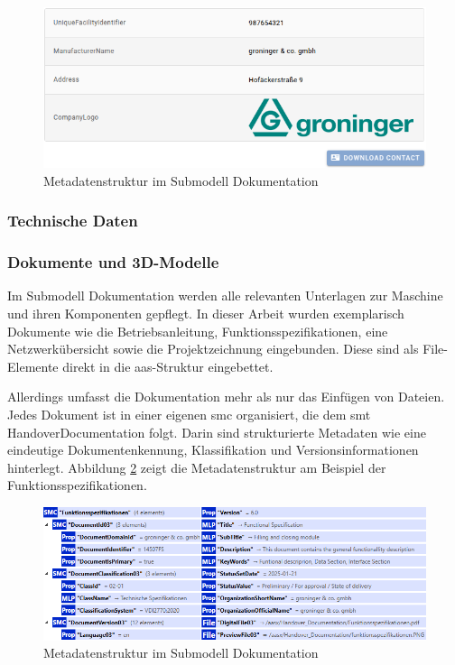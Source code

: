 \begin{figure}[htbp]
    \centering
        \includegraphics[width=1\textwidth]{Bilder/Ergebnisse/StatischeDaten/Typenschildisualisierung.png}
    \caption{Metadatenstruktur im Submodell Dokumentation}
    \label{fig:Doku}
\end{figure}

\subsubsection*{Technische Daten}
\vspace{-0.5em}


\subsubsection*{Dokumente und 3D-Modelle}
\vspace{-0.5em}
Im Submodell Dokumentation werden alle relevanten Unterlagen zur Maschine und ihren Komponenten gepflegt.
In dieser Arbeit wurden exemplarisch Dokumente wie die Betriebsanleitung, Funktionsspezifikationen, eine Netzwerkübersicht sowie die Projektzeichnung eingebunden.
Diese sind als File-Elemente direkt in die \acs{aas}-Struktur eingebettet.

Allerdings umfasst die Dokumentation mehr als nur das Einfügen von Dateien.
Jedes Dokument ist in einer eigenen \acs{smc} organisiert, die dem \acs{smt} HandoverDocumentation \cite{SpezifikationDokumentation} folgt.
Darin sind strukturierte Metadaten wie eine eindeutige Dokumentenkennung, Klassifikation und Versionsinformationen hinterlegt.
Abbildung \ref{fig:Doku} zeigt die Metadatenstruktur am Beispiel der Funktionsspezifikationen.

\begin{figure}[htbp]
    \centering
        \includegraphics[width=1\textwidth]{Bilder/Ergebnisse/StatischeDaten/Doku.png}
    \caption{Metadatenstruktur im Submodell Dokumentation}
    \label{fig:Doku}
\end{figure}

